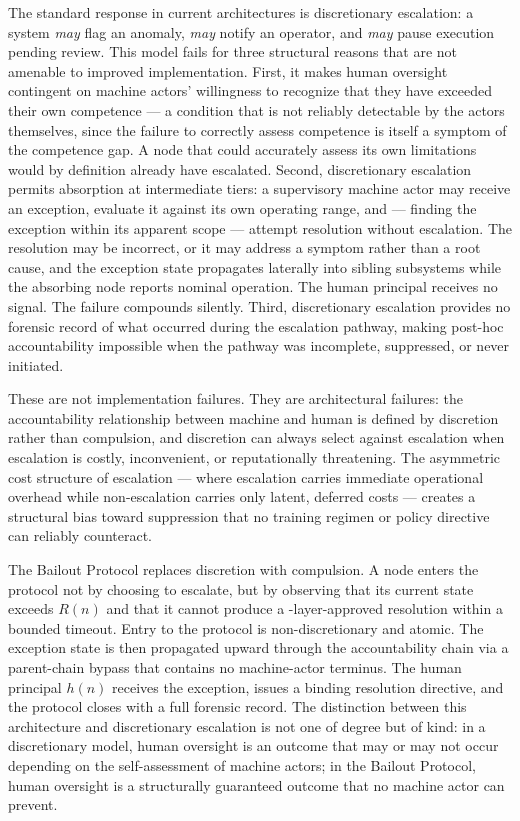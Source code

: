 The standard response in current architectures is discretionary escalation: a system \emph{may} flag an anomaly, \emph{may} notify an operator, and \emph{may} pause execution pending review. This model fails for three structural reasons that are not amenable to improved implementation. First, it makes human oversight contingent on machine actors' willingness to recognize that they have exceeded their own competence --- a condition that is not reliably detectable by the actors themselves, since the failure to correctly assess competence is itself a symptom of the competence gap. A node that could accurately assess its own limitations would by definition already have escalated. Second, discretionary escalation permits absorption at intermediate tiers: a supervisory machine actor may receive an exception, evaluate it against its own operating range, and --- finding the exception within its apparent scope --- attempt resolution without escalation. The resolution may be incorrect, or it may address a symptom rather than a root cause, and the exception state propagates laterally into sibling subsystems while the absorbing node reports nominal operation. The human principal receives no signal. The failure compounds silently. Third, discretionary escalation provides no forensic record of what occurred during the escalation pathway, making post-hoc accountability impossible when the pathway was incomplete, suppressed, or never initiated.

These are not implementation failures. They are architectural failures: the accountability relationship between machine and human is defined by discretion rather than compulsion, and discretion can always select against escalation when escalation is costly, inconvenient, or reputationally threatening. The asymmetric cost structure of escalation --- where escalation carries immediate operational overhead while non-escalation carries only latent, deferred costs --- creates a structural bias toward suppression that no training regimen or policy directive can reliably counteract.

The Bailout Protocol replaces discretion with compulsion. A node enters the protocol not by choosing to escalate, but by observing that its current state exceeds $R(n)$ and that it cannot produce a \fact{}-layer-approved resolution within a bounded timeout. Entry to the protocol is non-discretionary and atomic. The exception state is then propagated upward through the accountability chain via a parent-chain bypass that contains no machine-actor terminus. The human principal $h(n)$ receives the exception, issues a binding resolution directive, and the protocol closes with a full forensic record. The distinction between this architecture and discretionary escalation is not one of degree but of kind: in a discretionary model, human oversight is an outcome that may or may not occur depending on the self-assessment of machine actors; in the Bailout Protocol, human oversight is a structurally guaranteed outcome that no machine actor can prevent.

